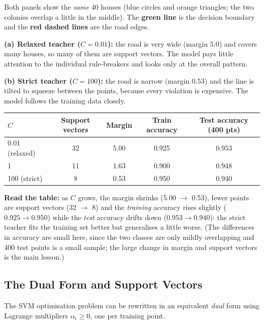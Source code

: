 \begin{explain}
Both panels show the \emph{same} 40 houses (blue circles and orange triangles; the two colonies overlap a little in the middle). The \textbf{green line} is the decision boundary and the \textbf{red dashed lines} are the road edges.

\medskip
\textbf{(a) Relaxed teacher ($C=0.01$):} the road is very wide (margin $5.0$) and covers many houses, so many of them are support vectors. The model pays little attention to the individual rule-breakers and looks only at the overall pattern.

\textbf{(b) Strict teacher ($C=100$):} the road is narrow (margin $0.53$) and the line is tilted to squeeze between the points, because every violation is expensive. The model follows the training data closely.
\end{explain}

\medskip
\begin{center}
\begin{tabular}{@{}lcccc@{}}
\toprule
\textbf{$C$} & \textbf{Support vectors} & \textbf{Margin} & \textbf{Train accuracy} & \textbf{Test accuracy (400 pts)}\\
\midrule
0.01 (relaxed) & 32 & 5.00 & 0.925 & 0.953\\
1 & 11 & 1.63 & 0.900 & 0.948\\
100 (strict) & 8 & 0.53 & 0.950 & 0.940\\
\bottomrule
\end{tabular}
\end{center}

\textbf{Read the table:} as $C$ grows, the margin shrinks (5.00 $\to$ 0.53), fewer points are support vectors (32 $\to$ 8) and the \emph{training} accuracy rises slightly ($0.925\to0.950$) while the \emph{test} accuracy drifts down ($0.953\to0.940$): the strict teacher fits the training set better but generalises a little worse. (The differences in accuracy are small here, since the two classes are only mildly overlapping and 400 test points is a small sample; the large change in margin and support vectors is the main lesson.)

\subsection{The Dual Form and Support Vectors}

The SVM optimisation problem can be rewritten in an equivalent \emph{dual} form using Lagrange multipliers $\alpha_i\ge0$, one per training point.

